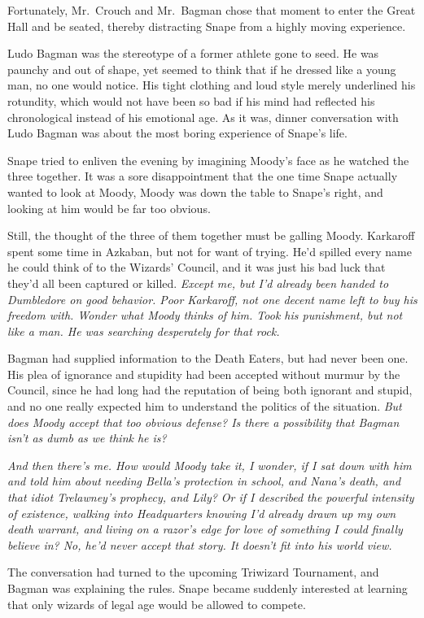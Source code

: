 Fortunately, Mr.~Crouch and Mr.~Bagman chose that moment to enter the Great Hall and be seated, thereby distracting Snape from a highly{\el} moving{\el} experience.

Ludo Bagman was the stereotype of a former athlete gone to seed. He was paunchy and out of shape, yet seemed to think that if he dressed like a young man, no one would notice. His tight clothing and loud style merely underlined his rotundity, which would not have been so bad if his mind had reflected his chronological instead of his emotional age. As it was, dinner conversation with Ludo Bagman was about the most boring experience of Snape's life.

Snape tried to enliven the evening by imagining Moody's face as he watched the three together. It was a sore disappointment that the one time Snape actually wanted to look at Moody, Moody was down the table to Snape's right, and looking at him would be far too obvious.

Still, the thought of the three of them together must be galling Moody. Karkaroff spent some time in Azkaban, but not for want of trying. He'd spilled every name he could think of to the Wizards' Council, and it was just his bad luck that they'd all been captured or killed. \emph{Except me, but I'd already been handed to Dumbledore on good behavior. Poor Karkaroff, not one decent name left to buy his freedom with. Wonder what Moody thinks of him. Took his punishment, but not like a man. He was searching desperately for that rock.}

Bagman had supplied information to the Death Eaters, but had never been one. His plea of ignorance and stupidity had been accepted without murmur by the Council, since he had long had the reputation of being both ignorant and stupid, and no one really expected him to understand the politics of the situation. \emph{But does Moody accept that too obvious defense? Is there a possibility that Bagman isn't as dumb as we think he is?}

\emph{And then there's me. How would Moody take it, I wonder, if I sat down with him and told him about needing Bella's protection in school, and Nana's death, and that idiot Trelawney's prophecy, and Lily? Or if I described the powerful intensity of existence, walking into Headquarters knowing I'd already drawn up my own death warrant, and living on a razor's edge for love of something I could finally believe in? No, he'd never accept that story. It doesn't fit into his world view.}

The conversation had turned to the upcoming Triwizard Tournament, and Bagman was explaining the rules. Snape became suddenly interested at learning that only wizards of legal age would be allowed to compete.

